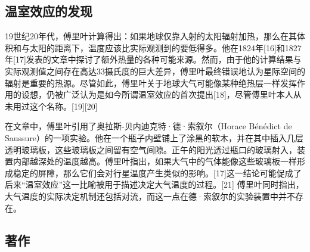 \subsection{温室效应的发现}
19世纪20年代，傅里叶计算得出：如果地球仅靠入射的太阳辐射加热，那么在其体积和与太阳的距离下，温度应该比实际观测到的要低得多。他在1824年[16]和1827年[17]发表的文章中探讨了额外热量的各种可能来源。然而，由于他的计算结果与实际观测值之间存在高达33摄氏度的巨大差异，傅里叶最终错误地认为星际空间的辐射是重要的热源。尽管如此，傅里叶关于地球大气可能像某种绝热层一样发挥作用的设想，仍被广泛认为是如今所谓温室效应的首次提出[18]，尽管傅里叶本人从未用过这个名称。[19][20]

在文章中，傅里叶引用了奥拉斯-贝内迪克特·德·索叙尔（Horace Bénédict de Saussure）的一项实验。他在一个瓶子内壁铺上了涂黑的软木，并在其中插入几层透明玻璃板，这些玻璃板之间留有空气间隙。正午的阳光透过瓶口的玻璃射入，装置内部越深处的温度越高。傅里叶指出，如果大气中的气体能像这些玻璃板一样形成稳定的屏障，那么它们会对行星温度产生类似的影响。[17]这一结论可能促成了后来“温室效应”这一比喻被用于描述决定大气温度的过程。[21] 傅里叶同时指出，大气温度的实际决定机制还包括对流，而这一点在德·索叙尔的实验装置中并不存在。
\subsection{著作}